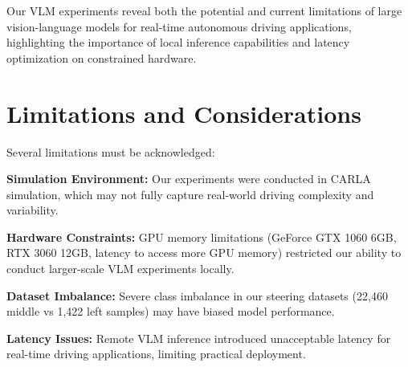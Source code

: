 Our VLM experiments reveal both the potential and current limitations of large vision-language models for real-time autonomous driving applications, highlighting the importance of local inference capabilities and latency optimization on constrained hardware.

\section{Limitations and Considerations}

Several limitations must be acknowledged:

\textbf{Simulation Environment:} Our experiments were conducted in CARLA simulation, which may not fully capture real-world driving complexity and variability.

\textbf{Hardware Constraints:} GPU memory limitations (GeForce GTX 1060 6GB, RTX 3060 12GB, latency to access more GPU memory) restricted our ability to conduct larger-scale VLM experiments locally.

\textbf{Dataset Imbalance:} Severe class imbalance in our steering datasets (22,460 middle vs 1,422 left samples) may have biased model performance.

\textbf{Latency Issues:} Remote VLM inference introduced unacceptable latency for real-time driving applications, limiting practical deployment.

